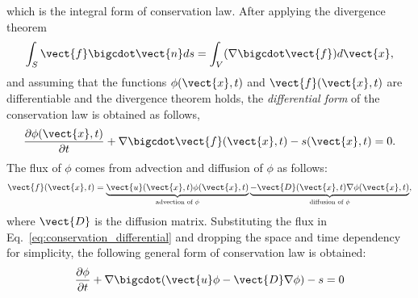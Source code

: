 which is the integral form of conservation law. After applying the divergence theorem 
 \begin{equation}
\int_{{S}} \vect{f} \bigcdot \vect{n} ds=
\int_{{V}} (\nabla \bigcdot \vect{f})   d{\vect{x}},
\label{eq:divergence_theo}
\end{equation}
and assuming that the functions $\phi(\vect{x},t)$ and $\vect{f}(\vect {x},t)$ are differentiable and the divergence theorem holds, the \textit{differential form} of the conservation law is obtained as follows,
\begin{align}
\frac{\partial \phi (\vect{x},t) }{\partial t}  +
\nabla \bigcdot \vect{f}(\vect {x},t) 
-
s(\vect{x},t)=0.
\label{eq:conservation_differential}
\end{align}
The flux of $\phi$ comes from advection and diffusion of $\phi$ as follows:
\begin{align}
\vect{f}(\vect{x},t)=
\underbrace{\vect{u}(\vect{x},t) \phi(\vect{x},t)}_{\text{advection of $\phi$}} 
\underbrace{- \vect{D}(\vect{x},t) \nabla\phi(\vect{x},t)}_{\text{diffusion of $\phi$}},
\label{eq:Flux}
\end{align} 
where $\vect{D}$ is the diffusion matrix. Substituting the flux in Eq.~\ref{eq:conservation_differential} and dropping the space and time dependency for simplicity, the following general form of conservation law is obtained:
\begin{align}
\frac{\partial \phi  }{\partial t}  + \nabla \bigcdot (\vect{u} \phi - \vect{D}  \nabla \phi) -s=0
\label{eq:transport_simple}
\end{align}


